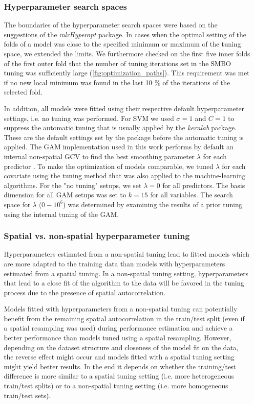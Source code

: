 \documentclass[review]{elsarticle}
\begin{document}
\subsubsection{Hyperparameter search spaces}
The boundaries of the hyperparameter search spaces were based on the suggestions of the \textit{mlrHyperopt} package.
In cases when the optimal setting of the folds of a model was close to the specified minimum or maximum of the tuning space, we extended the limits.
We furthermore checked on the first five inner folds of the first outer fold that the number of tuning iterations set in the \ac{SMBO} tuning was sufficiently large (\autoref{fig:optimization_paths}).
This requirement was met if no new local minimum was found in the last 10 \% of the iterations of the selected fold.

In addition, all models were fitted using their respective default hyperparameter settings, i.e. no tuning was performed.
For SVM we used $\sigma = 1$ and $C = 1$ to suppress the automatic tuning that is usually applied by the \emph{kernlab} package.
These are the default settings set by the package before the automatic tuning is applied.
The GAM implementation used in this work performs by default an internal non-spatial \ac{GCV} to find the best smoothing parameter $\lambda$ for each predictor \citep{mgcv}.
To make the optimization of models comparable, we tuned $\lambda$ for each covariate using the tuning method that was also applied to the machine-learning algorithms.
For the "no tuning" setups, we set $\lambda = 0$ for all predictors.
The basis dimension for all GAM setups was set to $k = 15$ for all variables.
The search space for $\lambda$ ($0 - 10^{6}$) was determined by examining the results of a prior tuning using the internal tuning of the GAM.

\subsubsection{Spatial vs. non-spatial hyperparameter tuning}
Hyperparameters estimated from a non-spatial tuning lead to fitted models which are more adapted to the training data than models with hyperparameters estimated from a spatial tuning.
In a non-spatial tuning setting, hyperparameters that lead to a close fit of the algorithm to the data will be favored in the tuning process due to the presence of spatial autocorrelation.

Models fitted with hyperparameters from a non-spatial tuning can potentially benefit from the remaining spatial autocorrelation in the train/test split (even if a spatial resampling was used) during performance estimation and achieve a better performance than models tuned using a spatial resampling.
However, depending on the dataset structure and closeness of the model fit on the data, the reverse effect might occur and models fitted with a spatial tuning setting might yield better results.
In the end it depends on whether the training/test difference is more similar to a spatial tuning setting (i.e. more heterogeneous train/test splits) or to a non-spatial tuning setting (i.e. more homogeneous train/test sets).
\end{document}
